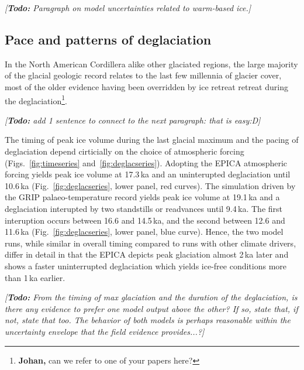 \documentclass[tc, manuscript]{copernicus}
\newcommand{\todo}[1]{\emph{[\textbf{Todo:} #1]}}
\begin{document}
\todo{Paragraph on model uncertainties related to warm-based ice.}

\subsection{Pace and patterns of deglaciation}

In the North American Cordillera alike other glaciated regions, the large
majority of the glacial geologic record relates to the last few millennia of
glacier cover, most of the older evidence having been overridden by ice retreat
retreat during the deglaciation\footnote{\textbf{Johan,} can we refer to one
of your papers here?}.

\todo{add 1 sentence to connect to the next paragraph: that is easy:D}

The timing of peak ice volume during the last glacial maximum and the pacing of
deglaciation depend cirticially on the choice of atmospheric forcing
(Figs.~\ref{fig:timeseries} and~\ref{fig:deglacseries}). Adopting the EPICA
atmospheric forcing yields peak ice volume at 17.3\,ka and an uninterupted
deglaciation until 10.6\,ka (Fig.~\ref{fig:deglacseries}, lower panel, red
curves). The simulation driven by the GRIP palaeo-temperature record yields
peak ice volume at 19.1\,ka and a deglaciation interupted by two standstills or
readvances until 9.4\,ka. The first interuption occurs between 16.6 and
14.5\,ka, and the second between 12.6 and 11.6\,ka
(Fig.~\ref{fig:deglacseries}, lower panel, blue curve). Hence, the two model
runs, while similar in overall timing compared to runs with other climate
drivers, differ in detail in that the EPICA depicts peak glaciation almost
2\,ka later and shows a faster uninterrupted deglaciation which yields ice-free
conditions more than 1\,ka earlier.

\todo{From the timing of max glaciation and the duration of the deglaciation,
is there any evidence to prefer one model output above the other? If so, state
that, if not, state that too. The behavior of both models is perhaps reasonable
within the uncertainty envelope that the field evidence provides...?}
\end{document}
